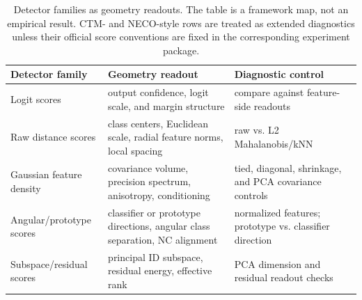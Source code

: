 \begin{table}[t]
\caption{Detector families as geometry readouts. The table is a framework map,
not an empirical result. CTM- and NECO-style rows are treated as extended
diagnostics unless their official score conventions are fixed in the
corresponding experiment package.}
\label{tab:readout-map}
\begin{center}
\footnotesize
\setlength{\tabcolsep}{4pt}
\renewcommand{\arraystretch}{1.12}
\begin{tabular}{@{}p{}p{}p{}@{}}
\toprule
Detector family & Geometry readout & Diagnostic control \\
\midrule
Logit scores
& output confidence, logit scale, and margin structure
& compare against feature-side readouts \\
Raw distance scores
& class centers, Euclidean scale, radial feature norms, local spacing
& raw vs. L2 Mahalanobis/kNN \\
Gaussian feature density
& covariance volume, precision spectrum, anisotropy, conditioning
& tied, diagonal, shrinkage, and PCA covariance controls \\
Angular/prototype scores
& classifier or prototype directions, angular class separation, NC alignment
& normalized features; prototype vs. classifier direction \\
Subspace/residual scores
& principal ID subspace, residual energy, effective rank
& PCA dimension and residual readout checks \\
\bottomrule
\end{tabular}
\end{center}
\end{table}

